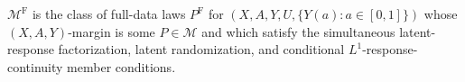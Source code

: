 \(\mathcal M^{\mathrm F}\) is the class of full-data laws \(P^{\mathrm F}\) for \((X,A,Y,U,\{Y(a):a\in[0,1]\})\) whose \((X,A,Y)\)-margin is some \(P\in\mathcal M\) and which satisfy the simultaneous latent-response factorization, latent randomization, and conditional \(L^1\)-response-continuity member conditions.